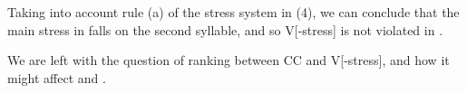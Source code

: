 \documentclass[11pt,draft]{article}
\begin{document}
Taking into account rule (a) of the stress system in (4), we can conclude that the main stress in \textsl{} falls on the second syllable, and so {\sc *V[-stress]} is not violated in \textsl{\textipa{[ht5ft]}}.

We are left with the question of ranking between {\sc *CC} and {\sc *V[-stress]}, and how it might affect \textsl{} and \textsl{}.







\end{document}
